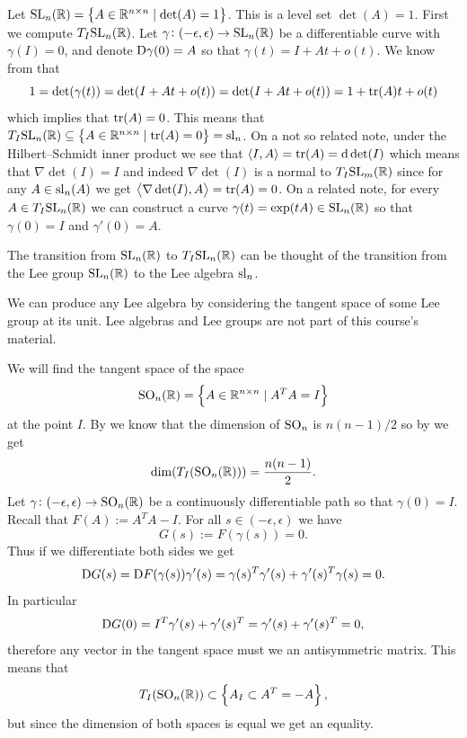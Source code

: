 \documentclass[11pt,a4paper]{article}
\begin{document}
\begin{example}
  Let $\mathrm{SL}_n(\mathbb{R}) = \left\{A \in \mathbb{R}^{n \times n} \mid \det(A) = 1\right\}$.
  This is a level set $\det(A) = 1$.
  First we compute $T_I \mathrm{SL}_n(\mathbb{R})$.
  Let $\gamma \colon (-\epsilon,\epsilon) \to \mathrm{SL}_n(\mathbb{R})$ be a differentiable
  curve with $\gamma(I) = 0$, and denote $\mathrm{D} \gamma(0) = A$
  so that $\gamma(t) = I + At + o(t)$.
  We know from  that
  \[
    1 =
    \det(\gamma(t)) =
    \det(I + At + o(t)) =
    \det(I + At + o(t)) =
    1 + \operatorname{tr}(A)t + o(t)
  \]
  which implies that $\operatorname{tr}(A) = 0$.
  This means that
  $T_I \mathrm{SL}_n(\mathbb{R}) \subseteq \left\{A \in \mathbb{R}^{n \times n} \mid \operatorname{tr}(A) = 0\right\}
  = \mathrm{sl}_n$.
  On a not so related note,
  under the Hilbert--Schmidt inner product we see that
  $\left\langle I, A \right\rangle = \operatorname{tr}(A) = \mathrm{d} \det(I)$
  which means that $\nabla \det(I) = I$
  and indeed $\nabla \det(I)$ is a normal to $T_I\mathrm{SL}_m(\mathbb{R})$
  since for any $A \in \mathrm{sl}_n(A)$ we get $\left\langle \nabla \det(I), A \right\rangle = \operatorname{tr}(A) = 0$.
  On a related note, for every $A \in T_I \mathrm{SL}_n(\mathbb{R})$ we can construct
  a curve $\gamma(t) = \exp(tA) \in \mathrm{SL}_n(\mathbb{R})$
  so that $\gamma(0) = I$ and $\gamma'(0) = A$.

  The transition from $\mathrm{SL}_n(\mathbb{R})$ to $T_I \mathrm{SL}_n(\mathbb{R})$ can be thought
  of the transition from the Lee group $\mathrm{SL}_n(\mathbb{R})$ to
  the Lee algebra $\mathrm{sl}_n$.
\end{example}
\begin{remark}
  We can produce any Lee algebra by considering the tangent
  space of some Lee group at its unit.
  Lee algebras and Lee groups are not part of this course's material.
\end{remark}

\begin{example}
  We will find the tangent space of the space
  \[
    \mathrm{SO}_n(\mathbb{R}) =
    \left\{A \in \mathbb{R}^{n \times n} \mid A^T A = I\right\}
  \]
  at the point $I$.
  By  we know that the dimension of $\mathrm{SO}_n$
  is $n(n-1)/2$ so by 
  we get
  \[
    \dim(T_I(\mathrm{SO}_n(\mathbb{R}))) = \frac{n (n - 1)}{2}.
  \]
  Let $\gamma \colon (-\epsilon,\epsilon) \to \mathrm{SO}_n(\mathbb{R})$
  be a continuously differentiable path so that
  $\gamma(0) = I$.
  Recall that $F(A) := A^T A - I$.
  For all $s \in (-\epsilon,\epsilon)$ we have
  \[
    G(s) := F(\gamma(s)) = 0.
  \]
  Thus if we differentiate both sides we get
  \[
    \mathrm{D} G(s) =
    \mathrm{D} F(\gamma(s)) \gamma'(s) =
    \gamma(s)^T \gamma'(s) + \gamma'(s)^T \gamma(s) = 0.
  \]
  In particular
  \[
    \mathrm{D} G(0) =
    I^T \gamma'(s) + \gamma'(s)^T =
    \gamma'(s) + \gamma'(s)^T = 0,
  \]
  therefore any vector in the tangent space must we an antisymmetric
  matrix.
  This means that
  \[
    T_I(\mathrm{SO}_n(\mathbb{R})) \subset \left\{A_I \subset A^T = -A\right\},
  \]
  but since the dimension of both spaces is equal we get an equality.
\end{example}
\end{document}
